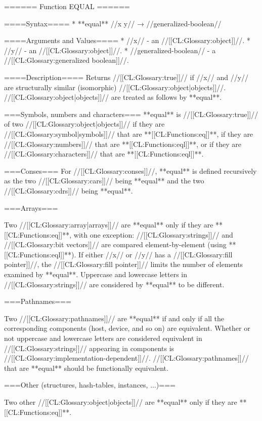 ====== Function EQUAL ======

====Syntax====
  * **equal** //x y// → //generalized-boolean//

====Arguments and Values====
  * //x// - an //[[CL:Glossary:object]]//.
  * //y// - an //[[CL:Glossary:object]]//.
  * //generalized-boolean// - a //[[CL:Glossary:generalized boolean]]//.

====Description====
Returns //[[CL:Glossary:true]]// if //x// and //y// are structurally similar (isomorphic) //[[CL:Glossary:object|objects]]//. //[[CL:Glossary:object|objects]]// are treated as follows by **equal**.

===Symbols, numbers and characters===
**equal** is //[[CL:Glossary:true]]// of two //[[CL:Glossary:object|objects]]// if they are //[[CL:Glossary:symbol|symbols]]// that are **[[CL:Functions:eq]]**, if they are //[[CL:Glossary:numbers]]// that are **[[CL:Functions:eql]]**, or if they are //[[CL:Glossary:characters]]// that are **[[CL:Functions:eql]]**.

===Conses===
For //[[CL:Glossary:conses]]//, **equal** is defined recursively as the two //[[CL:Glossary:cars]]// being **equal** and the two //[[CL:Glossary:cdrs]]// being **equal**.

===Arrays===

Two //[[CL:Glossary:array|arrays]]// are **equal** only if they are **[[CL:Functions:eq]]**, with one exception: //[[CL:Glossary:strings]]// and //[[CL:Glossary:bit vectors]]// are compared element-by-element (using **[[CL:Functions:eql]]**). If either //x// or //y// has a //[[CL:Glossary:fill pointer]]//, the //[[CL:Glossary:fill pointer]]// limits the number of elements examined by **equal**. Uppercase and lowercase letters in //[[CL:Glossary:strings]]// are considered by **equal** to be different.

===Pathnames===

Two //[[CL:Glossary:pathnames]]// are **equal** if and only if all the corresponding components (host, device, and so on) are equivalent. Whether or not uppercase and lowercase letters are considered equivalent in //[[CL:Glossary:strings]]// appearing in components is //[[CL:Glossary:implementation-dependent]]//. //[[CL:Glossary:pathnames]]// that are **equal** should be functionally equivalent.

===Other (structures, hash-tables, instances, ...)===

Two other //[[CL:Glossary:object|objects]]// are **equal** only if they are **[[CL:Functions:eq]]**.

